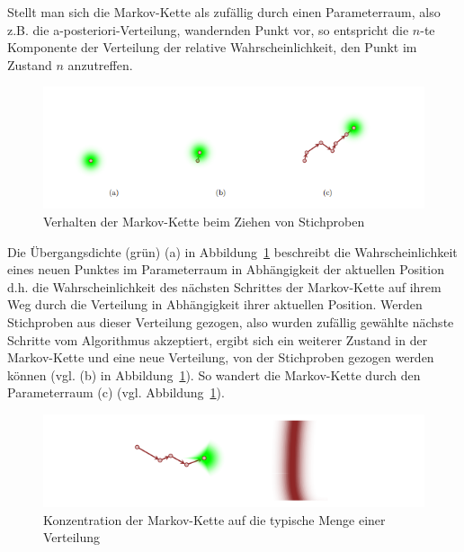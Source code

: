 \documentclass[ngerman]{ttlab-qualify}
\begin{document}
Stellt man sich die Markov-Kette als zufällig durch einen Parameterraum, also z.B. die a-posteriori-Verteilung, wandernden Punkt vor, so entspricht die $n$-te Komponente der Verteilung der relative Wahrscheinlichkeit, den Punkt im Zustand $n$ anzutreffen. 
\begin{figure}[]
\begin{center}
\includegraphics[scale=.9]{images/markov-chain-plain-betancourt-2017}
\caption{Verhalten der Markov-Kette beim Ziehen von Stichproben \parencite{betancourt:2017}}
\label{fig:markov-chain-plain}
\end{center}
\end{figure}

Die Übergangsdichte (grün) (a) in Abbildung~\ref{fig:markov-chain-plain} beschreibt die Wahrscheinlichkeit eines neuen Punktes im Parameterraum in Abhängigkeit der aktuellen Position d.h. die Wahrscheinlichkeit des nächsten Schrittes der Markov-Kette auf ihrem Weg durch die Verteilung in Abhängigkeit ihrer aktuellen Position.  Werden Stichproben aus dieser Verteilung gezogen, also wurden zufällig gewählte nächste Schritte vom Algorithmus akzeptiert, ergibt sich ein weiterer Zustand in der Markov-Kette und eine neue Verteilung, von der Stichproben gezogen werden können (vgl. (b) in Abbildung~\ref{fig:markov-chain-plain}). So wandert die Markov-Kette durch den Parameterraum (c) (vgl. Abbildung~\ref{fig:markov-chain-plain}).

\begin{figure}[H]
\begin{center}
\includegraphics[scale=.9]{images/markov-chain-target-betancourt-2017}
\caption{Konzentration der Markov-Kette auf die typische Menge einer Verteilung \parencite{betancourt:2017}}
\label{fig:markov-chain-target}
\end{center}
\end{figure}
\end{document}
